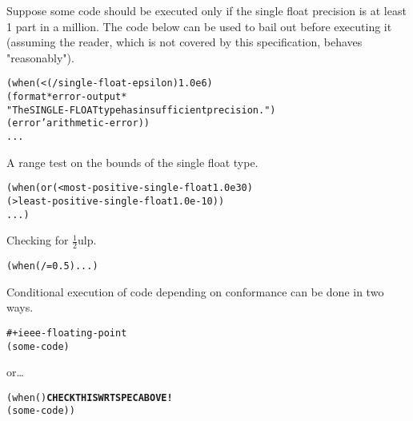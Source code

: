 \documentclass[../Example-Program.tex]{subfiles}
\begin{document}
Suppose some code should be executed only if the single float
precision is at least 1 part in a million.  The code below can be used
to bail out before executing it (assuming the \CL{} reader,
which is not covered by this specification, behaves "reasonably").
\begin{alltt}
    (when (< (/ single-float-epsilon) 1.0e6)
        (format *error-output*
                "The SINGLE-FLOAT type has insufficient precision.")
        (error 'arithmetic-error))
    ...
\end{alltt}

\noindent
A range test on the bounds of the single float type.
\begin{alltt}
    (when (or (< most-positive-single-float 1.0e30)
              (> least-positive-single-float 1.0e-10))
        ...)
\end{alltt}

\noindent
{}
Checking for $\frac{1}{2}$ulp.
\begin{alltt}
    (when (/= 0.5) ...)
\end{alltt}

\noindent
Conditional execution of code depending on conformance can be done in
two ways.
\begin{alltt}
    #+ieee-floating-point 
    (some-code) 
\end{alltt}
or\ldots
\begin{alltt}
    (when () \textbf{CHECK THIS WRT SPEC ABOVE!}
        (some-code))
\end{alltt}
\end{document}
